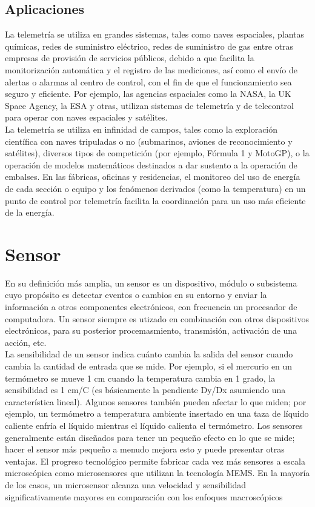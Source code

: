 \subsection{Aplicaciones}

La telemetría se utiliza en grandes sistemas, tales como naves espaciales, plantas químicas, redes de suministro eléctrico, redes de suministro de gas entre otras empresas de 
provisión de servicios públicos, debido a que facilita la monitorización automática y el registro de las mediciones, así como el envío de alertas o alarmas al centro de control, 
con el fin de que el funcionamiento sea seguro y eficiente. Por ejemplo, las agencias espaciales como la NASA, la UK Space Agency, la ESA y otras, utilizan sistemas de telemetría
y de telecontrol para operar con naves espaciales y satélites.\\

La telemetría se utiliza en infinidad de campos, tales como la exploración científica con naves tripuladas o no (submarinos, aviones de reconocimiento y satélites), 
diversos tipos de competición (por ejemplo, Fórmula 1 y MotoGP), o la operación de modelos matemáticos destinados a dar sustento a la operación de embalses. En las fábricas, 
oficinas y residencias, el monitoreo del uso de energía de cada sección o equipo y los fenómenos derivados (como la temperatura) en un punto de control por 
telemetría facilita la coordinación para un uso más eficiente de la energía.\\

\section{Sensor}
\label{sec:sensor-definicion}

En su definición más amplia, un sensor es un dispositivo, módulo o subsistema cuyo propósito es detectar eventos o cambios en su entorno y enviar la información a otros
componentes electrónicos, con frecuencia un procesador de computadora. Un sensor siempre es utizado en combinación con otros dispositivos electrónicos, para su posterior 
procemasmiento, transmisión, activación de una acción, etc.\\

La sensibilidad de un sensor indica cuánto cambia la salida del sensor cuando cambia la cantidad de entrada que se mide. Por ejemplo, si el mercurio en un termómetro se mueve
1 cm cuando la temperatura cambia en 1 grado, la sensibilidad es 1 cm/C (es básicamente la pendiente Dy/Dx asumiendo una característica lineal). Algunos sensores también pueden
afectar lo que miden; por ejemplo, un termómetro a temperatura ambiente insertado en una taza de líquido caliente enfría el líquido mientras el líquido calienta el termómetro.
Los sensores generalmente están diseñados para tener un pequeño efecto en lo que se mide; hacer el sensor más pequeño a menudo mejora esto y puede presentar otras ventajas. 
El progreso tecnológico permite fabricar cada vez más sensores a escala microscópica como microsensores que utilizan la tecnología MEMS. En la mayoría de los casos, un microsensor 
alcanza una velocidad y sensibilidad significativamente mayores en comparación con los enfoques macroscópicos

